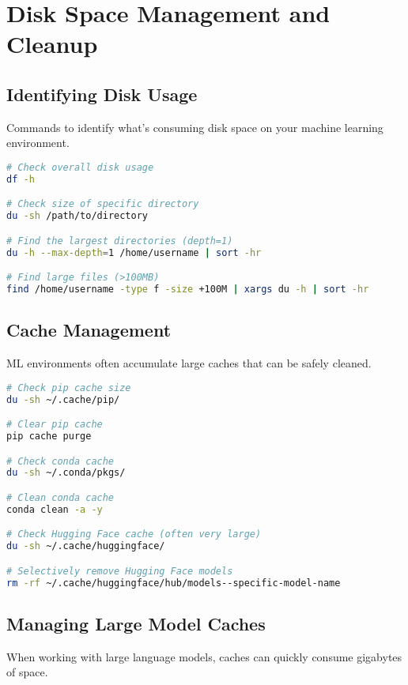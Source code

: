 \documentclass{article}
\begin{document}
\section{Disk Space Management and Cleanup}

\subsection{Identifying Disk Usage}
Commands to identify what's consuming disk space on your machine learning environment.

\begin{tcolorbox}[colback=red!5!white, colframe=red!75!black, title=Disk Usage Analysis]
\begin{lstlisting}[language=bash]
# Check overall disk usage
df -h

# Check size of specific directory
du -sh /path/to/directory

# Find the largest directories (depth=1)
du -h --max-depth=1 /home/username | sort -hr

# Find large files (>100MB)
find /home/username -type f -size +100M | xargs du -h | sort -hr
\end{lstlisting}
\end{tcolorbox}

\subsection{Cache Management}
ML environments often accumulate large caches that can be safely cleaned.

\begin{tcolorbox}[colback=red!5!white, colframe=red!75!black, title=Cache Cleanup]
\begin{lstlisting}[language=bash]
# Check pip cache size
du -sh ~/.cache/pip/

# Clear pip cache
pip cache purge

# Check conda cache
du -sh ~/.conda/pkgs/

# Clean conda cache
conda clean -a -y

# Check Hugging Face cache (often very large)
du -sh ~/.cache/huggingface/

# Selectively remove Hugging Face models
rm -rf ~/.cache/huggingface/hub/models--specific-model-name
\end{lstlisting}
\end{tcolorbox}

\subsection{Managing Large Model Caches}
When working with large language models, caches can quickly consume gigabytes of space.
\end{document}
